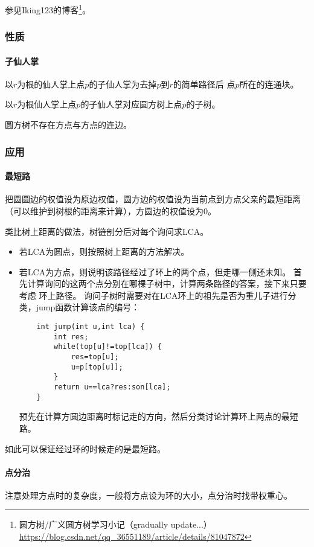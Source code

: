 参见Iking123的博客\footnote{
    圆方树/广义圆方树学习小记（gradually update...）\\
   \url{https://blog.csdn.net/qq\_36551189/article/details/81047872}
}。

\subsubsection{性质}
\paragraph{子仙人掌} 以$r$为根的仙人掌上点$p$的子仙人掌为去掉$p$到$r$的简单路径后
点$p$所在的连通块。
\begin{property}
    以$r$为根仙人掌上点$p$的子仙人掌对应圆方树上点$p$的子树。
\end{property}
\begin{property}
    圆方树不存在方点与方点的连边。
\end{property}

\subsubsection{应用}\label{CSTA}
\paragraph{最短路}
把圆圆边的权值设为原边权值，圆方边的权值设为当前点到方点父亲的最短距离
（可以维护到树根的距离来计算），方圆边的权值设为0。

类比树上距离的做法，树链剖分后对每个询问求LCA。
\begin{itemize}
    \item 若LCA为圆点，则按照树上距离的方法解决。
    \item 若LCA为方点，则说明该路径经过了环上的两个点，但走哪一侧还未知。
    首先计算询问的这两个点分别在哪棵子树中，计算两条路径的答案，接下来只要考虑
    环上路径。
    询问子树时需要对在LCA环上的祖先是否为重儿子进行分类，jump函数计算该点的编号：
    \begin{lstlisting}
    int jump(int u,int lca) {
        int res;
        while(top[u]!=top[lca]) {
            res=top[u];
            u=p[top[u]];
        }
        return u==lca?res:son[lca];
    }
    \end{lstlisting}
    预先在计算方圆边距离时标记走的方向，然后分类讨论计算环上两点的最短路。
\end{itemize}
如此可以保证经过环的时候走的是最短路。
\paragraph{点分治}
注意处理方点时的复杂度，一般将方点设为环的大小，点分治时找带权重心。

